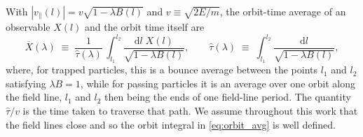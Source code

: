 \documentclass{jpp}
\newcommand{\rmd}{\text{d}}
\newcommand{\vpar}{v_\parallel}
\begin{document}
With $|\vpar(l)| = v\sqrt{1 - \lambda B(l)}$ and $v \equiv \sqrt{2E/m}$, the orbit-time average of an observable $X(l)$ and the orbit time itself are
\begin{equation}\label{eq:orbit_avg}
\overline{X}(\lambda) \;\equiv\; \frac{1}{\hat\tau(\lambda)}\,\int_{l_1}^{l_2}\!\frac{\rmd l\; X(l)}{\sqrt{1 - \lambda B(l)}},\qquad
\hat\tau(\lambda) \;\equiv\; \int_{l_1}^{l_2}\!\frac{\rmd l}{\sqrt{1 - \lambda B(l)}},
\end{equation}
where, for trapped particles, this is a bounce average between the points $l_1$ and $l_2$ satisfying $\lambda B = 1$, while for passing particles it is an average over one orbit along the field line, $l_1$ and $l_2$ then being the ends of one field-line period. The quantity $\hat\tau/v$ is the time taken to traverse that path. We assume throughout this work that the field lines close and so the orbit integral in \cref{eq:orbit_avg} is well defined. 
\end{document}
